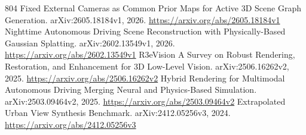 \documentclass[11pt]{article}
\begin{document}
\begin{thebibliography}{804}
 Fixed External Cameras as Common Prior Maps for Active 3D Scene Graph Generation. arXiv:2605.18184v1, 2026. \url{https://arxiv.org/abs/2605.18184v1}
 Nighttime Autonomous Driving Scene Reconstruction with Physically-Based Gaussian Splatting. arXiv:2602.13549v1, 2026. \url{https://arxiv.org/abs/2602.13549v1}
 R3eVision A Survey on Robust Rendering, Restoration, and Enhancement for 3D Low-Level Vision. arXiv:2506.16262v2, 2025. \url{https://arxiv.org/abs/2506.16262v2}
 Hybrid Rendering for Multimodal Autonomous Driving Merging Neural and Physics-Based Simulation. arXiv:2503.09464v2, 2025. \url{https://arxiv.org/abs/2503.09464v2}
 Extrapolated Urban View Synthesis Benchmark. arXiv:2412.05256v3, 2024. \url{https://arxiv.org/abs/2412.05256v3}
\end{thebibliography}
\end{document}
